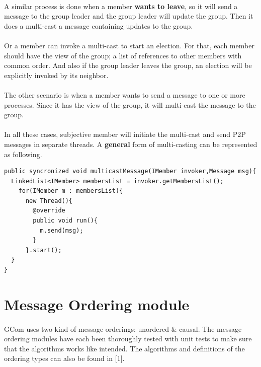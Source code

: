 \documentclass[a4paper,english,twoside]{article}
\begin{document}
\paragraph{}
A similar process is done when a member \textbf{wants to leave}, so it will send a message to the group leader and the group leader will update the group. Then it does a multi-cast a message containing updates to the group.
\paragraph{}
Or a member can invoke a multi-cast to start an election. For that, each member should have the view of the group; a list of references to other members with common order. And also if the group leader leaves the group, an election will be explicitly invoked by its neighbor.

\paragraph{}
The other scenario is when a member wants to send a message to one or more processes. Since it has the view of the group, it will multi-cast the message to the group.

\paragraph{}
In all these cases, subjective member will initiate the multi-cast and send P2P messages in separate threads. A \textbf{general} form of multi-casting can be represented as following.

{ \begin{lstlisting}
public syncronized void multicastMessage(IMember invoker,Message msg){
  LinkedList<IMember> membersList = invoker.getMembersList();
    for(IMember m : membersList){
      new Thread(){
        @override
        public void run(){
          m.send(msg);
        }
      }.start();
  }
}
\end{lstlisting}}

\section{Message Ordering module}
\paragraph{}
GCom uses two kind of message orderings: unordered \& causal. The message ordering modules have each been thoroughly tested with unit tests
to make sure that the algorithms works like intended. The algorithms and definitions of the ordering types can also be found in [1].
\end{document}
